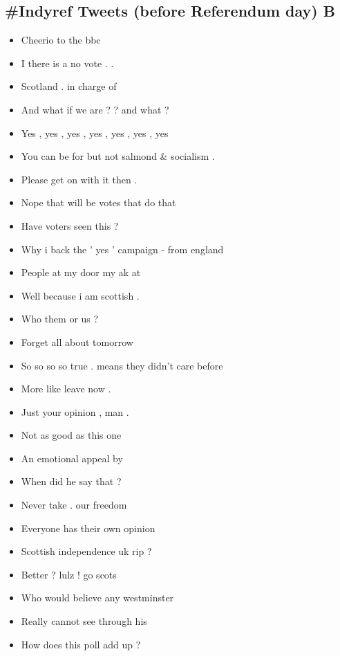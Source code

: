 \documentclass[tikz]{article}
\begin{document}
\begin{multicols}{2}
    \vfill
    \columnbreak

    \subsection*{\#Indyref Tweets (before Referendum day) B}
    \begin{itemize}[noitemsep,nolistsep,label={}]
		\item{Cheerio to the bbc}
		\item{I there is a no vote . .}
		\item{Scotland . in charge of}
		\item{And what if we are ? ? and what ?}
		\item{Yes , yes , yes , yes , yes , yes , yes}
		\item{You can be for but not salmond \& socialism .}
		\item{Please get on with it then .}
		\item{Nope that will be votes that do that}
		\item{Have voters seen this ?}
		\item{Why i back the ' yes ' campaign - from england}
		\item{People at my door my ak at}
		\item{Well because i am scottish .}
		\item{Who them or us ?}
		\item{Forget all about tomorrow}
		\item{So so so so true . means they didn't care before}
		\item{More like leave now .}
		\item{Just your opinion , man .}
		\item{Not as good as this one}
		\item{An emotional appeal by}
		\item{When did he say that ?}
		\item{Never take . our freedom}
		\item{Everyone has their own opinion}
		\item{Scottish independence uk rip ?}
		\item{Better ? lulz ! go scots}
		\item{Who would believe any westminster}
		\item{Really cannot see through his}
		\item{How does this poll add up ?}

\end{itemize}
\end{multicols}
\end{document}
